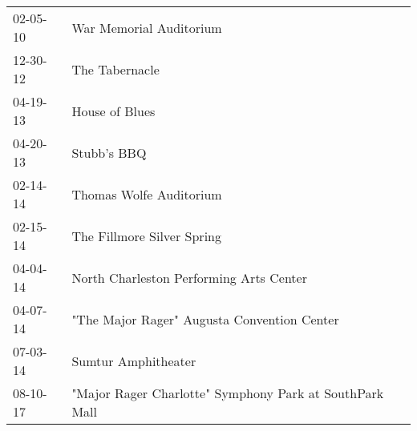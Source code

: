 \begin{supertabular}{p{0.25\columnwidth}p{0.75\columnwidth}}
 02-05-10 &                                  War Memorial Auditorium \\
 12-30-12 &                                           The Tabernacle \\
 04-19-13 &                                           House of Blues \\
 04-20-13 &                                              Stubb's BBQ \\
 02-14-14 &                                  Thomas Wolfe Auditorium \\
 02-15-14 &                               The Fillmore Silver Spring \\
 04-04-14 &                  North Charleston Performing Arts Center \\
 04-07-14 &              "The Major Rager" Augusta Convention Center \\
 07-03-14 &                                      Sumtur Amphitheater \\
 08-10-17 &  "Major Rager Charlotte" Symphony Park at SouthPark Mall \\
\end{supertabular}
